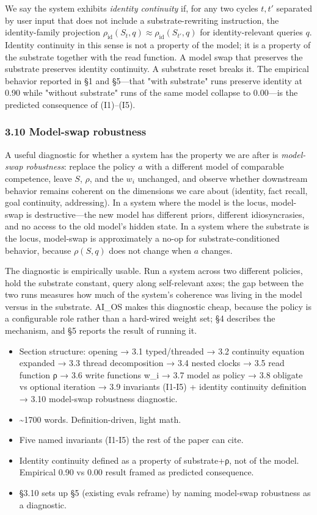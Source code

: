 \documentclass[11pt,letterpaper]{article}
\begin{document}
We say the system exhibits \emph{identity continuity} if, for any two cycles $t, t'$ separated by user input that does not include a substrate-rewriting instruction, the identity-family projection $\rho_{\text{id}}(S_t, q) \approx \rho_{\text{id}}(S_{t'}, q)$ for identity-relevant queries $q$. Identity continuity in this sense is not a property of the model; it is a property of the substrate together with the read function. A model swap that preserves the substrate preserves identity continuity. A substrate reset breaks it. The empirical behavior reported in §1 and §5---that "with substrate" runs preserve identity at 0.90 while "without substrate" runs of the same model collapse to 0.00---is the predicted consequence of (I1)–(I5).

\subsubsection*{3.10 Model-swap robustness}

A useful diagnostic for whether a system has the property we are after is \emph{model-swap robustness}: replace the policy $a$ with a different model of comparable competence, leave $S$, $\rho$, and the $w_i$ unchanged, and observe whether downstream behavior remains coherent on the dimensions we care about (identity, fact recall, goal continuity, addressing). In a system where the model is the locus, model-swap is destructive---the new model has different priors, different idiosyncrasies, and no access to the old model's hidden state. In a system where the substrate is the locus, model-swap is approximately a no-op for substrate-conditioned behavior, because $\rho(S, q)$ does not change when $a$ changes.

The diagnostic is empirically usable. Run a system across two different policies, hold the substrate constant, query along self-relevant axes; the gap between the two runs measures how much of the system's coherence was living in the model versus in the substrate. AI\_OS makes this diagnostic cheap, because the policy is a configurable role rather than a hard-wired weight set; §4 describes the mechanism, and §5 reports the result of running it.

\begin{itemize}
  \item Section structure: opening → 3.1 typed/threaded → 3.2 continuity equation expanded → 3.3 thread decomposition → 3.4 nested clocks → 3.5 read function ρ → 3.6 write functions w\_i → 3.7 model as policy → 3.8 obligate vs optional iteration → 3.9 invariants (I1-I5) + identity continuity definition → 3.10 model-swap robustness diagnostic.
  \item \textasciitilde{}1700 words. Definition-driven, light math.
  \item Five named invariants (I1-I5) the rest of the paper can cite.
  \item Identity continuity defined as a property of substrate+ρ, not of the model. Empirical 0.90 vs 0.00 result framed as predicted consequence.
  \item §3.10 sets up §5 (existing evals reframe) by naming model-swap robustness as a diagnostic.
\end{itemize}
\end{document}
